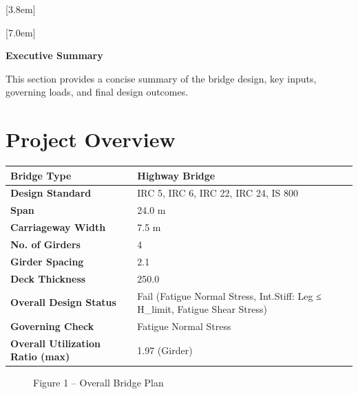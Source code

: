 \documentclass[12pt,a4paper]{report}
\numberwithin{table}{chapter}
\numberwithin{figure}{chapter}
\begin{document}
[3.8em]
  {\normalfont}
  {\contentslabel{2.3em}}
  {\hspace*{-2.3em}}
  {\hfill\contentspage}

[7.0em]
  {\normalfont}
  {\contentslabel{3.2em}}
  {\hspace*{-3.2em}}
  {\hfill\contentspage}

\newpage
\renewcommand{\contentsname}{\centering\Large\bfseries Table of Contents}
\tableofcontents


\newpage
{\centering\Large\bfseries Executive Summary\par}
\vspace{0.8em}

This section provides a concise summary of the bridge design, key inputs, governing loads, and final design outcomes.

\section*{Project Overview}
\label{sec:project-overview}


\begin{tabular}{|L{5.5cm}|L{8.5cm}|}
\hline
\textbf{Bridge Type} & Highway Bridge \\
\hline
\textbf{Design Standard} & IRC 5, IRC 6, IRC 22, IRC 24, IS 800 \\
\hline
\textbf{Span} & 24.0 m \\
\hline
\textbf{Carriageway Width} & 7.5 m \\
\hline
\textbf{No. of Girders} & 4 \\
\hline
\textbf{Girder Spacing} & 2.1 \\
\hline
\textbf{Deck Thickness} & 250.0 \\
\hline
\textbf{Overall Design Status} & Fail (Fatigue Normal Stress, Int.Stiff:\allowbreak{} Leg ≤ H\_\allowbreak{}limit, Fatigue Shear Stress) \\
\hline
\textbf{Governing Check} & Fatigue Normal Stress \\
\hline
\textbf{Overall Utilization Ratio (max)} & 1.97 (Girder) \\
\hline
\end{tabular}


\begin{figure}[H]
\centering
{}
\caption*{Figure 1 -- Overall Bridge Plan}
\end{figure}
\end{document}

